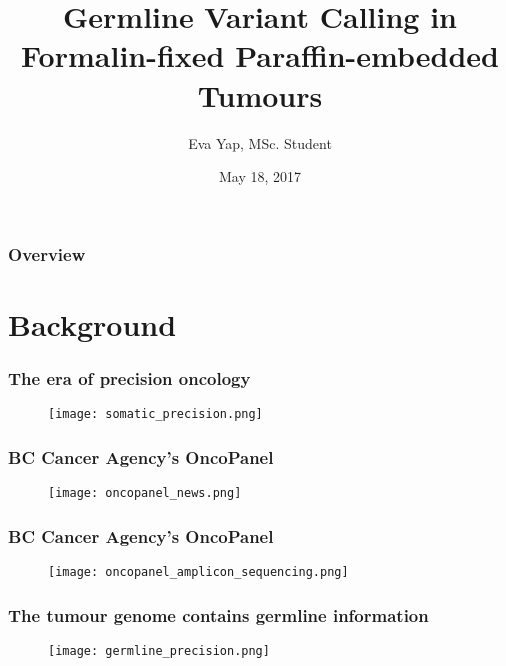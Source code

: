\documentclass{beamer}
\title{Germline Variant Calling in Formalin-fixed Paraffin-embedded Tumours}
\author{Eva Yap, MSc. Student}
\date{May 18, 2017}
\begin{document}
\frame{\titlepage}

\begin{frame}
\frametitle{Overview}
\tableofcontents
\end{frame}


\section{Background}

\begin{frame}
\frametitle{The era of precision oncology}
\begin{figure}[t]
    \texttt{[image: somatic\_precision.png]}
\end{figure}
\end{frame}

\begin{frame}
\frametitle{BC Cancer Agency's OncoPanel}
\begin{figure}[t]
    \texttt{[image: oncopanel\_news.png]}
\end{figure}
\end{frame}

\begin{frame}
\frametitle{BC Cancer Agency's OncoPanel}
\begin{figure}[t]
    \texttt{[image: oncopanel\_amplicon\_sequencing.png]}
\end{figure}
\begin{enumerate}
\end{enumerate}
\end{frame}

\begin{frame}
\frametitle{The tumour genome contains germline information}
\begin{figure}[t]
    \texttt{[image: germline\_precision.png]}
\end{figure}
\end{frame}
\end{document}
